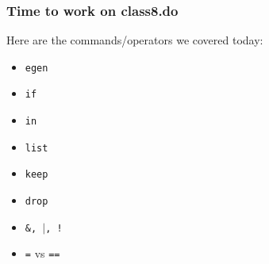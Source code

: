 \documentclass[11pt]{beamer}
\begin{document}
\begin{frame}
\frametitle{Time to work on class8.do}
Here are the commands/operators we covered today:
		\begin{itemize}
			\item \texttt{egen}
			\item \texttt{if}
			\item \texttt{in}
			\item \texttt{list}
			\item \texttt{keep}
			\item \texttt{drop}
			\item \texttt{\&, $\vert$, !}
			\item \texttt{=} vs \texttt{==}
		\end{itemize}
\end{frame}
\end{document}
